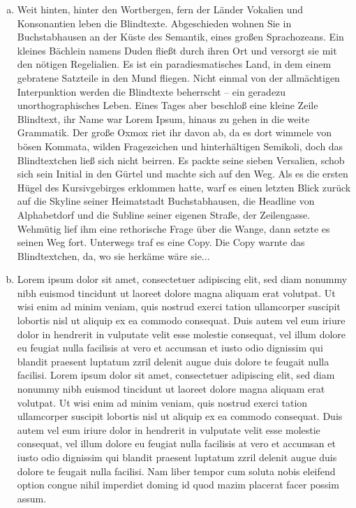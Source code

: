 \documentclass{uebungsblatt}
\begin{document}
\begin{enumerate}[a)]
  \item Weit hinten, hinter den Wortbergen, fern der Länder Vokalien und Konsonantien leben die Blindtexte. Abgeschieden wohnen Sie in Buchstabhausen an der Küste des Semantik, eines großen Sprachozeans. Ein kleines Bächlein namens Duden fließt durch ihren Ort und versorgt sie mit den nötigen Regelialien. Es ist ein paradiesmatisches Land, in dem einem gebratene Satzteile in den Mund fliegen. Nicht einmal von der allmächtigen Interpunktion werden die Blindtexte beherrscht – ein geradezu unorthographisches Leben. Eines Tages aber beschloß eine kleine Zeile Blindtext, ihr Name war Lorem Ipsum, hinaus zu gehen in die weite Grammatik. Der große Oxmox riet ihr davon ab, da es dort wimmele von bösen Kommata, wilden Fragezeichen und hinterhältigen Semikoli, doch das Blindtextchen ließ sich nicht beirren. Es packte seine sieben Versalien, schob sich sein Initial in den Gürtel und machte sich auf den Weg. Als es die ersten Hügel des Kursivgebirges erklommen hatte, warf es einen letzten Blick zurück auf die Skyline seiner Heimatstadt Buchstabhausen, die Headline von Alphabetdorf und die Subline seiner eigenen Straße, der Zeilengasse. Wehmütig lief ihm eine rethorische Frage über die Wange, dann setzte es seinen Weg fort. Unterwegs traf es eine Copy. Die Copy warnte das Blindtextchen, da, wo sie herkäme wäre sie...
  \item Lorem ipsum dolor sit amet, consectetuer adipiscing elit, sed diam nonummy nibh euismod tincidunt ut laoreet dolore magna aliquam erat volutpat. Ut wisi enim ad minim veniam, quis nostrud exerci tation ullamcorper suscipit lobortis nisl ut aliquip ex ea commodo consequat. Duis autem vel eum iriure dolor in hendrerit in vulputate velit esse molestie consequat, vel illum dolore eu feugiat nulla facilisis at vero et accumsan et iusto odio dignissim qui blandit praesent luptatum zzril delenit augue duis dolore te feugait nulla facilisi. Lorem ipsum dolor sit amet, consectetuer adipiscing elit, sed diam nonummy nibh euismod tincidunt ut laoreet dolore magna aliquam erat volutpat. Ut wisi enim ad minim veniam, quis nostrud exerci tation ullamcorper suscipit lobortis nisl ut aliquip ex ea commodo consequat. Duis autem vel eum iriure dolor in hendrerit in vulputate velit esse molestie consequat, vel illum dolore eu feugiat nulla facilisis at vero et accumsan et iusto odio dignissim qui blandit praesent luptatum zzril delenit augue duis dolore te feugait nulla facilisi. Nam liber tempor cum soluta nobis eleifend option congue nihil imperdiet doming id quod mazim placerat facer possim assum.
\end{enumerate}
\end{document}
